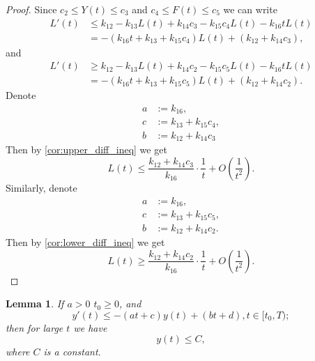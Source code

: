 \documentclass[pdflatex,sn-mathphys-num]{sn-jnl}
\theoremstyle{thmstyleone}
\newtheorem{lemma}{Lemma}[section]
\theoremstyle{thmstyletwo}
\theoremstyle{thmstylethree}
\begin{document}
\begin{proof}
Since $c_2\leq Y(t)\leq c_3$ and $c_4\leq F(t)\leq c_5$ we can write 
\begin{align*}
L'(t) &\leq k_{12}-k_{13}L(t)+k_{14}c_3-k_{15}c_4 L(t) -k_{16}t L(t) \\
&= -(k_{16}t+k_{13}+k_{15}c_4)L(t)+(k_{12}+k_{14}c_3),
\end{align*}
and
\begin{align*}
L'(t) &\geq k_{12}-k_{13}L(t)+k_{14}c_2-k_{15}c_5 L(t)-k_{16}t L(t) \\
&= -(k_{16}t+k_{13}+k_{15}c_5)L(t)+(k_{12}+k_{14}c_2).
\end{align*}
Denote
\begin{align*}
a &:=k_{16}, \\
c &:=k_{13}+k_{15}c_4, \\
b &:=k_{12}+k_{14}c_3
\end{align*}
Then by \autoref{cor:upper_diff_ineq} we get 
\begin{equation}
L(t)\leq \frac{k_{12}+k_{14}c_3}{k_{16}}\cdot\frac{1}{t}+O\left(\frac{1}{t^2} \right).
\end{equation}
Similarly, denote
\begin{align*}
a &:=k_{16}, \\
c &:=k_{13}+k_{15}c_5, \\
b &:=k_{12}+k_{14}c_2.
\end{align*}
Then by \autoref{cor:lower_diff_ineq} we get
\begin{equation}
L(t)\geq \frac{k_{12}+k_{14}c_2}{k_{16}}\cdot\frac{1}{t}+O\left(\frac{1}{t^2} \right).
\end{equation}
\end{proof}

\begin{lemma}\label{lem:upper_diff_ineq_gen}
If $a>0$ $t_0\geq 0$, and 
\begin{equation*}
y'(t)\leq -(at+c)y(t)+(bt+d),  t\in[t_0,T);
\end{equation*}
then for large $t$ we have
\begin{equation*}
y(t)\leq C,
\end{equation*}
where $C$ is a constant. 
\end{lemma}
\end{document}
